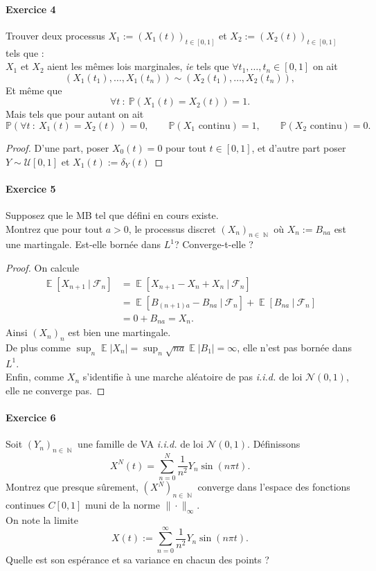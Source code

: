 \documentclass{article}
\theoremstyle{definition}
\numberwithin{equation}{section}
\DeclareMathOperator{\N}{\mathbb{N}}
\DeclareMathOperator{\E}{\mathbb{E}}
\begin{document}
\paragraph{Exercice 4}
Trouver deux processus $X_1:=(X_1(t))_{t\in[0,1]}$ et $X_2:=(X_2(t))_{t\in[0,1]}$ tels que :\\
$X_1$ et $X_2$ aient les mêmes lois marginales, \textit{ie} tels que $\forall t_1,\dots, t_n\in[0,1]$ on ait
$$ (X_1(t_1),\dots,X_1(t_n))\sim (X_2(t_1),\dots,X_2(t_n)), $$
Et même que 
$$ \forall t ~:~\mathbb{P}(X_1(t)=X_2(t))=1. $$
Mais tels que pour autant on ait
$$ \mathbb{P}(\forall t~:~X_1(t)=X_2(t)~)=0,\qquad \mathbb{P}(X_1\text{ continu})=1,\qquad \mathbb{P}(X_2\text{ continu})=0. $$ 

\begin{proof}
D'une part, poser $X_0(t)=0$ pour tout $t\in[0,1]$, et d'autre part poser $Y\sim\mathcal{U}[0,1]$ et $X_1(t):=\delta_Y(t)$
\end{proof}


\paragraph{Exercice 5}
Supposez que le MB tel que défini en cours existe.\\
Montrez que pour tout $a>0$, le processus discret $(X_n)_{n\in\N}$ où $X_n:=B_{na}$ est une martingale. Est-elle bornée dans $L^1$? Converge-t-elle ?

\begin{proof}
On calcule 
\begin{align*}
    \E[X_{n+1}~|~\mathcal{F}_n] &= \E[X_{n+1}-X_n+X_n~|~\mathcal{F}_n]\\
    &=\E[B_{(n+1)a}-B_{na}~|~\mathcal{F}_n]+\E[B_{na}~|~\mathcal{F}_n]\\
    &= 0 + B_{na}=X_n.
\end{align*}
Ainsi $(X_n)_n$ est bien une martingale. 
\\
De plus comme $\sup_n\E|X_n|=\sup_n\sqrt{na}\E|B_1|=\infty$, elle n'est pas bornée dans $L^1$.\\
Enfin, comme $X_n$ s'identifie à une marche aléatoire de pas \textit{i.i.d.} de loi $\mathcal{N}(0,1)$, elle ne converge pas.
\end{proof}

\paragraph{Exercice 6}
Soit $(Y_n)_{n\in\N}$ une famille de VA \textit{i.i.d.} de loi $\mathcal{N}(0,1)$. Définissons 
$$X^N(t) = \sum_{n=0}^N \frac{1}{n^2}Y_n \sin(n\pi t).$$
Montrez que presque sûrement, $(X^N)_{n\in\N}$ converge dans l'espace des fonctions continues $C[0,1]$ muni de la norme $\|\cdot\|_\infty$.\\
On note la limite 
$$X(t):= \sum_{n=0}^\infty \frac{1}{n^2}Y_n \sin(n\pi t).$$
Quelle est son espérance et sa variance en chacun des points ?
\end{document}
